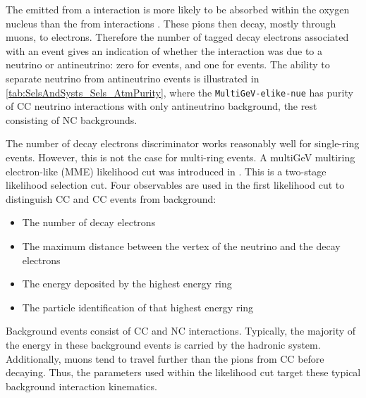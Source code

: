 The \quickmath{\pi^{-}} emitted from a  interaction is more likely to be absorbed within the oxygen nucleus than the \quickmath{\pi^{+}} from  interactions \cite{LeeKaPik}. These pions then decay, mostly through muons, to electrons. Therefore the number of tagged decay electrons associated with an event gives an indication of whether the interaction was due to a neutrino or antineutrino: zero for  events, and one for  events. The ability to separate neutrino from antineutrino events is illustrated in \autoref{tab:SelsAndSysts_Sels_AtmPurity}, where the \texttt{MultiGeV-elike-nue} has  purity of CC neutrino interactions with only  antineutrino background, the rest consisting of NC backgrounds.

The number of decay electrons discriminator works reasonably well for single-ring events. However, this is not the case for multi-ring events. A multiGeV multiring electron-like (MME) likelihood cut was introduced in \cite{PhysRevD.81.092004, PhysRevD.74.032002}. This is a two-stage likelihood selection cut. Four observables are used in the first likelihood cut to distinguish CC and CC events from background:

\begin{itemize}
\item The number of decay electrons
\item The maximum distance between the vertex of the neutrino and the decay electrons
\item The energy deposited by the highest energy ring
\item The particle identification of that highest energy ring
\end{itemize}

Background events consist of CC\quickmath{\nu_{\mu}} and NC interactions. Typically, the majority of the energy in these background events is carried by the hadronic system. Additionally, muons tend to travel further than the pions from CC before decaying. Thus, the parameters used within the likelihood cut target these typical background interaction kinematics.


